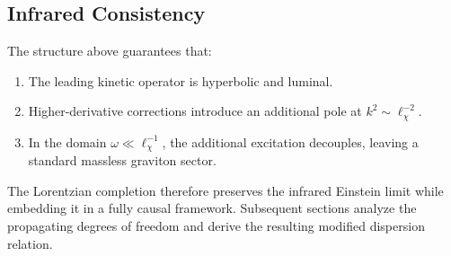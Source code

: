   \subsection{Infrared Consistency}
    \label{subsec:infrared-consistency}

    The structure above guarantees that:

    \begin{enumerate}
      \item The leading kinetic operator is hyperbolic and luminal.
      \item Higher-derivative corrections introduce an additional pole at $k^2 \sim \ell_\chi^{-2}$.
      \item In the domain $\omega \ll \ell_\chi^{-1}$,
      the additional excitation decouples,
      leaving a standard massless graviton sector.
    \end{enumerate}

    The Lorentzian completion therefore preserves the infrared Einstein
    limit while embedding it in a fully causal framework.
    Subsequent sections analyze the propagating degrees of freedom and
    derive the resulting modified dispersion relation.
